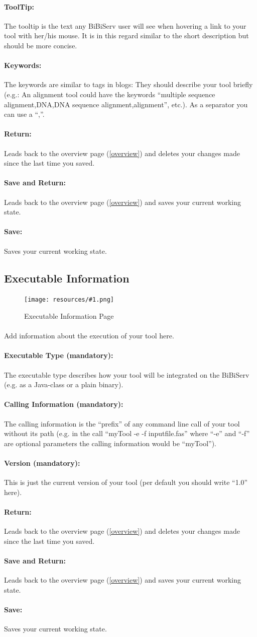 \documentclass[a4paper,10pt]{book}
\newcommand{\bigpic}[1]{\texttt{[image: resources/\#1.png]}}
\newcommand{\buttonsDetail}[1]{
\paragraph{Return:} Leads back to #1 and deletes your changes made since the last time you saved.
\paragraph{Save and Return:} Leads back to #1 and saves your current working state.
\paragraph{Save:} Saves your current working state.
}
\begin{document}
\paragraph{ToolTip:} The tooltip is the text any BiBiServ user will see when hovering a link to your 
tool with her/his mouse. It is in this regard similar to the short description but should be more concise.
\paragraph{Keywords:} The keywords are similar to tags in blogs: They should describe your tool briefly (e.g.: An alignment tool could have the keywords ``multiple sequence alignment,DNA,DNA sequence alignment,alignment'', etc.). As a separator you can use a ``,''.
\buttonsDetail{the overview page (\ref{overview})}

\subsection{Executable Information}
\label{execInfo}

\begin{figure}
 \bigpic{execInfo}
 \caption{Executable Information Page}
\end{figure}

\paragraph{} Add information about the execution of your tool here.
\paragraph{Executable Type (mandatory):} The executable type describes how your tool will be integrated on the BiBiServ (e.g. as a Java-class or a plain binary).
\paragraph{Calling Information (mandatory):} The calling information is the ``prefix'' of any command line call of your tool without its path (e.g. in the call ``myTool -e -f inputfile.fas'' where ``-e'' and ``-f'' are optional parameters the calling information would be ``myTool'').
\paragraph{Version (mandatory):} This is just the current version of your tool (per default you should write ``1.0'' here).
\buttonsDetail{the overview page (\ref{overview})}
\end{document}
